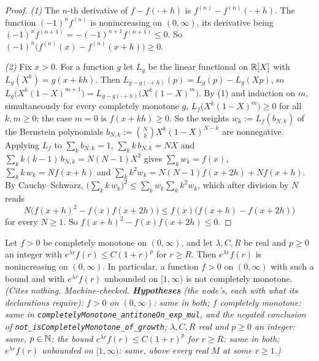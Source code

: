 \begin{proof}
\leanok
\emph{(1)} The $n$-th derivative of $f - f(\cdot + h)$ is $f^{(n)} - f^{(n)}(\cdot + h)$. The function
$(-1)^nf^{(n)}$ is nonincreasing on $(0, \infty)$, its derivative being
$(-1)^nf^{(n+1)} = -(-1)^{n+1}f^{(n+1)} \le 0$. So $(-1)^n\bigl(f^{(n)}(x) - f^{(n)}(x + h)\bigr) \ge 0$.

\emph{(2)} Fix $x > 0$. For a function $g$ let $L_g$ be the linear functional on $\mathbb{R}[X]$ with
$L_g(X^k) = g(x + kh)$. Then $L_{g - g(\cdot + h)}(p) = L_g(p) - L_g(Xp)$, so
$L_g\bigl(X^k(1 - X)^{m+1}\bigr) = L_{g - g(\cdot + h)}\bigl(X^k(1 - X)^m\bigr)$. By (1) and induction on
$m$, simultaneously for every completely monotone $g$, $L_f\bigl(X^k(1 - X)^m\bigr) \ge 0$ for all
$k, m \ge 0$; the case $m = 0$ is $f(x + kh) \ge 0$. So the weights $w_k := L_f(b_{N,k})$ of the
Bernstein polynomials $b_{N,k} := \binom NkX^k(1 - X)^{N-k}$ are nonnegative. Applying $L_f$ to
$\sum_kb_{N,k} = 1$, $\sum_kk\,b_{N,k} = NX$ and $\sum_kk(k - 1)\,b_{N,k} = N(N - 1)X^2$ gives
$\sum_kw_k = f(x)$, $\sum_kk\,w_k = Nf(x + h)$ and $\sum_kk^2w_k = N(N - 1)f(x + 2h) + Nf(x + h)$. By
Cauchy--Schwarz, $\bigl(\sum_kk\,w_k\bigr)^2 \le \sum_kw_k\sum_kk^2w_k$, which after division by $N$
reads
\[
  N\bigl(f(x + h)^2 - f(x)f(x + 2h)\bigr) \le f(x)\bigl(f(x + h) - f(x + 2h)\bigr)
\]
for every $N \ge 1$. So $f(x + h)^2 - f(x)f(x + 2h) \le 0$.
\end{proof}

\begin{lemma}
\label{lem:cm-exponential-rate}
\leanok
{}
Let $f > 0$ be completely monotone on $(0, \infty)$, and let $\lambda, C, R$ be real and $p \ge 0$ an
integer with $e^{\lambda r}f(r) \le C(1 + r)^p$ for $r \ge R$. Then $e^{\lambda r}f(r)$ is
nonincreasing on $(0, \infty)$. In particular, a function $f > 0$ on $(0, \infty)$ with such a bound
and with $e^{\lambda r}f(r)$ unbounded on $[1, \infty)$ is not completely monotone.
\statusT\quad\emph{(Cites nothing. Machine-checked. \textbf{Hypotheses} (the node's, each with
what its declarations require): $f > 0$ on $(0, \infty)$: same in both; $f$ completely monotone: same
in \texttt{completelyMonotone\_antitoneOn\_exp\_mul}, and the negated conclusion of
\texttt{not\_isCompletelyMonotone\_of\_growth}; $\lambda, C, R$ real and $p \ge 0$ an integer: same,
$p \in \mathbb{N}$; the bound $e^{\lambda r}f(r) \le C(1 + r)^p$ for $r \ge R$: same in both; $e^{\lambda
r}f(r)$ unbounded on $[1, \infty)$: same, above every real $M$ at some $r \ge 1$.)}
\end{lemma}

